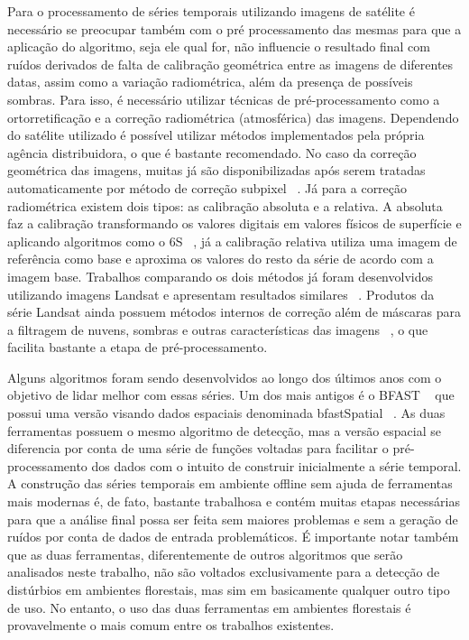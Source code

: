 \documentclass{article}
\begin{document}
Para o processamento de séries temporais utilizando imagens de satélite é necessário se preocupar também com o pré processamento das mesmas para que a aplicação do algoritmo, seja ele qual for, não influencie o resultado final com ruídos derivados de falta de calibração geométrica entre as imagens de diferentes datas, assim como a variação radiométrica, além da presença de possíveis sombras. Para isso, é necessário utilizar técnicas de pré-processamento como a ortorretificação e a correção radiométrica (atmosférica) das imagens. Dependendo do satélite utilizado é possível utilizar métodos implementados pela própria agência distribuidora, o que é bastante recomendado. No caso da correção geométrica das imagens, muitas já são disponibilizadas após serem tratadas automaticamente por método de correção subpixel ~\cite{Gutjahr2014}. Já para a correção radiométrica existem dois tipos: as calibração absoluta e a relativa. A absoluta faz a calibração transformando os valores digitais em valores físicos de superfície e aplicando algoritmos como o 6S ~\cite{Sagan2004}, já a calibração relativa utiliza uma imagem de referência como base e aproxima os valores do resto da série de acordo com a imagem base. Trabalhos comparando os dois métodos já foram desenvolvidos utilizando imagens Landsat e apresentam resultados similares ~\cite{Chen2010}. Produtos da série Landsat ainda possuem métodos internos de correção além de máscaras para a filtragem de nuvens, sombras e outras características das imagens ~\cite{ZHU2015269, ZHU201283, Huang2010}, o que facilita bastante a etapa de pré-processamento.
\par
Alguns algoritmos foram sendo desenvolvidos ao longo dos últimos anos com o objetivo de lidar melhor com essas séries. Um dos mais antigos é o BFAST \sloppy  ~\cite{VERBESSELT2010106, VERBESSELT20102970, VERBESSELT201298} que possui uma versão visando dados espaciais denominada bfastSpatial ~\cite{bfastSpatial}. As duas ferramentas possuem o mesmo algoritmo de detecção, mas a versão espacial se diferencia por conta de uma série de funções voltadas para facilitar o pré-processamento dos dados com o intuito de construir inicialmente a série temporal. A construção das séries temporais em ambiente offline sem ajuda de ferramentas mais modernas é, de fato, bastante trabalhosa e contém muitas etapas necessárias para que a análise final possa ser feita sem maiores problemas e sem a geração de ruídos por conta de dados de entrada problemáticos. É importante notar também que as duas ferramentas, diferentemente de outros algoritmos que serão analisados neste trabalho, não são voltados exclusivamente para a detecção de distúrbios em ambientes florestais,  mas sim em basicamente qualquer outro tipo de uso. No entanto, o uso das duas ferramentas em ambientes florestais é provavelmente o mais comum entre os trabalhos existentes. 
\end{document}
